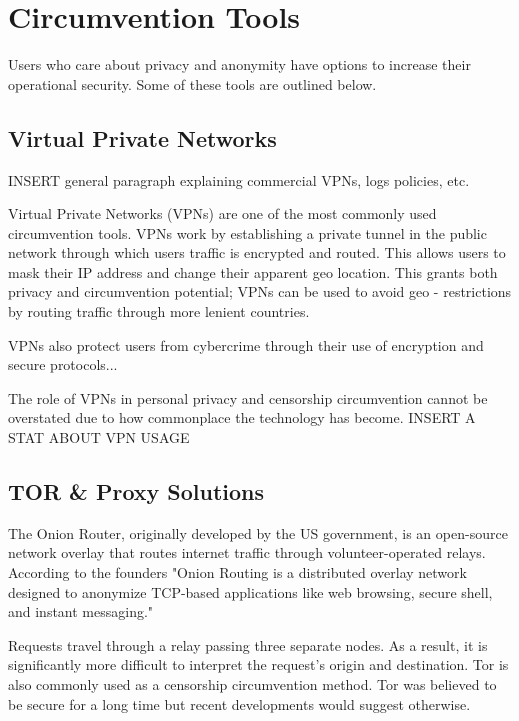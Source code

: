 \chapter{Circumvention Tools}

Users who care about privacy and anonymity have options to increase their operational security. Some of these tools are outlined below.

\section{Virtual Private Networks}

INSERT general paragraph explaining commercial VPNs, logs policies, etc.

Virtual Private Networks (VPNs) are one of the most commonly used circumvention tools. VPNs work by establishing a private tunnel in the public network through which users traffic is encrypted and routed. This allows users to mask their IP address and change their apparent geo location. This grants both privacy and circumvention potential; VPNs can be used to avoid geo - restrictions by routing traffic through more lenient countries. 

VPNs also protect users from cybercrime through their use of encryption and secure protocols...

The role of VPNs in personal privacy and censorship circumvention cannot be overstated due to how commonplace the technology has become. INSERT A STAT ABOUT VPN USAGE



\section{TOR \& Proxy Solutions}

The Onion Router, originally developed by the US government, is an open-source network overlay that routes internet traffic through volunteer-operated relays. According to the founders "Onion Routing is a distributed overlay network designed to anonymize TCP-based applications like web browsing, secure shell, and instant messaging."\cite{dingledine2004tor}

Requests travel through a relay passing three separate nodes. As a result, it is significantly more difficult to interpret the request’s origin and destination. Tor is also commonly used as a censorship circumvention method. Tor was believed to be secure for a long time but recent developments would suggest otherwise. \cite{tor_not_secure}



